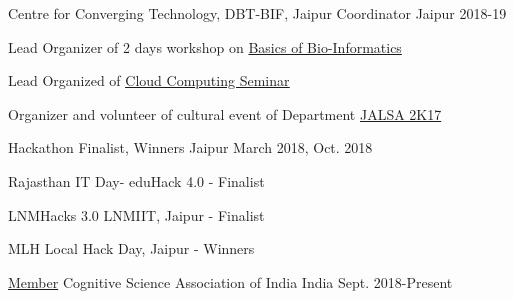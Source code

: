 \vspace{-0.3cm}


\begin{cventries}

  \extraentry
  {Centre for Converging Technology, DBT-BIF, Jaipur}
  {Coordinator}
  {Jaipur}
  {2018-19}
  {
    \begin{cvitems}
    \item Lead Organizer of 2 days workshop on \underline{Basics of Bio-Informatics} 
    \item Lead Organized of \href{https://drive.google.com/file/d/1PDJYCQRCsk0e_HojYzUzvAWycQPXnXpg/view?usp=sharing}{\underline{Cloud Computing Seminar}}
    \item Organizer and volunteer of cultural event of Department \underline{JALSA 2K17}
    \end{cvitems}
  }



  \extraentry{}
  {Hackathon Finalist, Winners}
  {Jaipur}
  {March 2018, Oct. 2018}
  {
    \begin{cvitems}
    \item Rajasthan IT Day- eduHack 4.0 - Finalist
    \item LNMHacks 3.0 LNMIIT, Jaipur - Finalist
    \item MLH Local Hack Day, Jaipur - Winners
    \end{cvitems}
  }

  \extraentry
  {\underline{Member}}
  {Cognitive Science Association of India}
  {India}
  {Sept. 2018-Present}
  {}

  \vspace{-0.3cm}


\end{cventries}

